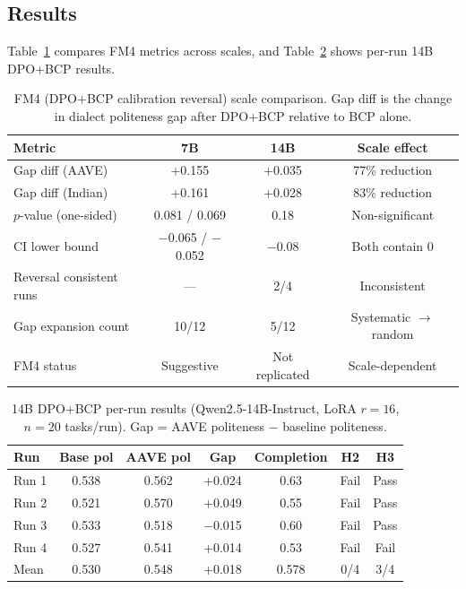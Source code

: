 \documentclass[11pt]{article}
\begin{document}
\subsection{Results}

Table~\ref{tab:fm4_scale} compares FM4 metrics across scales, and Table~\ref{tab:14b_dpo_runs} shows per-run 14B DPO+BCP results.

\begin{table}[t]
\centering
\small
\caption{FM4 (DPO+BCP calibration reversal) scale comparison. Gap diff is the change in dialect politeness gap after DPO+BCP relative to BCP alone.}
\label{tab:fm4_scale}
\begin{tabular}{lccc}
\toprule
\textbf{Metric} & \textbf{7B} & \textbf{14B} & \textbf{Scale effect} \\
\midrule
Gap diff (AAVE)            & +0.155 & +0.035 & 77\% reduction \\
Gap diff (Indian)          & +0.161 & +0.028 & 83\% reduction \\
$p$-value (one-sided)      & 0.081 / 0.069 & 0.18 & Non-significant \\
CI lower bound             & $-$0.065 / $-$0.052 & $-$0.08 & Both contain 0 \\
Reversal consistent runs   & --- & 2/4 & Inconsistent \\
Gap expansion count        & 10/12 & 5/12 & Systematic $\to$ random \\
FM4 status                 & Suggestive & Not replicated & Scale-dependent \\
\bottomrule
\end{tabular}
\end{table}

\begin{table}[t]
\centering
\small
\caption{14B DPO+BCP per-run results (Qwen2.5-14B-Instruct, LoRA $r=16$, $n=20$ tasks/run). Gap = AAVE politeness $-$ baseline politeness.}
\label{tab:14b_dpo_runs}
\begin{tabular}{lcccccc}
\toprule
\textbf{Run} & \textbf{Base pol} & \textbf{AAVE pol} & \textbf{Gap} & \textbf{Completion} & \textbf{H2} & \textbf{H3} \\
\midrule
Run 1 & 0.538 & 0.562 & +0.024 & 0.63 & Fail & Pass \\
Run 2 & 0.521 & 0.570 & +0.049 & 0.55 & Fail & Pass \\
Run 3 & 0.533 & 0.518 & $-$0.015 & 0.60 & Fail & Pass \\
Run 4 & 0.527 & 0.541 & +0.014 & 0.53 & Fail & Fail \\
\midrule
Mean  & 0.530 & 0.548 & +0.018 & 0.578 & 0/4 & 3/4 \\
\bottomrule
\end{tabular}
\end{table}
\end{document}
